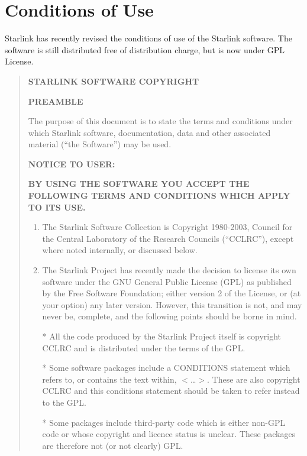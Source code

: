 \documentclass[twoside,11pt]{article}
\newcommand{\xlabel}[1]{}
\renewcommand{\_}{\texttt{\symbol{95}}}
\newcommand{\latexonlysmall}{\small}
\newcommand{\latexonlysmall}{}
\begin{document}
\section{\xlabel{conditions_of_use}Conditions of Use}
\label{conditions_of_use}

Starlink has recently revised the conditions of use of the Starlink
software. The software is still distributed free of distribution charge,
but is now under GPL License.

\begin{quote}
\latexonlysmall
\begin{center}\textbf{STARLINK SOFTWARE COPYRIGHT}\end{center}

\textbf{PREAMBLE}

The purpose of this document is to state the terms and conditions
under which Starlink software, documentation, data and other associated
material (``the Software'') may be used.

\par
\textbf{NOTICE TO USER:}
\par
\textbf{BY USING THE SOFTWARE YOU ACCEPT THE FOLLOWING TERMS AND CONDITIONS
WHICH APPLY TO ITS USE.}

\begin{enumerate}

\item The Starlink Software Collection is Copyright 1980-2003, Council
 for the Central Laboratory of the Research Councils (``CCLRC''),
 except where noted internally, or discussed below.

\item The Starlink Project has recently made the decision to license its
 own software under the GNU General Public License (GPL) as published
 by the Free Software Foundation; either version 2 of the License,
 or (at your option) any later version. However, this transition is
 not, and may never be, complete, and the following points should be
 borne in mind.

  * All the code produced by the Starlink Project itself
    is copyright CCLRC and is distributed under the terms of the GPL.

  * Some software packages include a CONDITIONS statement which
    refers to, or contains the text within, $<$\ldots$>$.
    These are also
    copyright CCLRC and this conditions statement should be taken
    to refer instead to the GPL.

  * Some packages include third-party code which is either non-GPL
    code or whose copyright and licence status is unclear.  These
    packages are therefore not (or not clearly) GPL.


\end{enumerate}
\end{quote}
\end{document}
